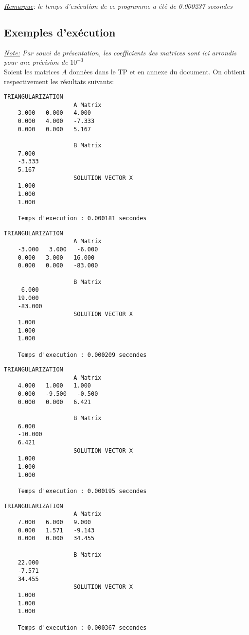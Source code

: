 \textit{\underline{Remarque}: le temps d'exécution de ce programme a été de 0.000237 secondes}
\newpage
\subsection{Exemples d'exécution}

\textit{\underline{Note:} Par souci de présentation, les coefficients des matrices sont ici arrondis pour une précision de $10^{-3}$}\vspace{4pt}\\
Soient les matrices $A$ données dans le TP et en annexe du document. On obtient respectivement les résultats suivants:\\

\begin{lstlisting}[caption={$A_1X=B$} results, basicstyle=\fontsize{8}{10}\selectfont]
					TRIANGULARIZATION 
					A Matrix 
	3.000   0.000   4.000   
	0.000   4.000   -7.333   
	0.000   0.000   5.167   
	
					B Matrix 
	7.000   
	-3.333   
	5.167   
					SOLUTION VECTOR X 
	1.000   
	1.000   
	1.000   
	
	Temps d'execution : 0.000181 secondes
\end{lstlisting}
\begin{lstlisting}[caption={$A_2X=B$} results, basicstyle=\fontsize{8}{10}\selectfont]
					TRIANGULARIZATION 
					A Matrix 
	-3.000   3.000   -6.000   
	0.000   3.000   16.000   
	0.000   0.000   -83.000   
	
					B Matrix 
	-6.000   
	19.000   
	-83.000   
					SOLUTION VECTOR X 
	1.000   
	1.000   
	1.000   
	
	Temps d'execution : 0.000209 secondes
\end{lstlisting}
\begin{lstlisting}[caption={$A_3X=B$} results, basicstyle=\fontsize{8}{10}\selectfont]
					TRIANGULARIZATION 
					A Matrix 
	4.000   1.000   1.000   
	0.000   -9.500   -0.500   
	0.000   0.000   6.421   
	
					B Matrix 
	6.000   
	-10.000   
	6.421   
					SOLUTION VECTOR X 
	1.000   
	1.000   
	1.000   
	
	Temps d'execution : 0.000195 secondes
\end{lstlisting}
\begin{lstlisting}[caption={$A_4X=B$} results, basicstyle=\fontsize{8}{10}\selectfont]
					TRIANGULARIZATION 
					A Matrix 
	7.000   6.000   9.000   
	0.000   1.571   -9.143   
	0.000   0.000   34.455   
	
					B Matrix 
	22.000   
	-7.571   
	34.455   
					SOLUTION VECTOR X 
	1.000   
	1.000   
	1.000   
	
	Temps d'execution : 0.000367 secondes
\end{lstlisting}
